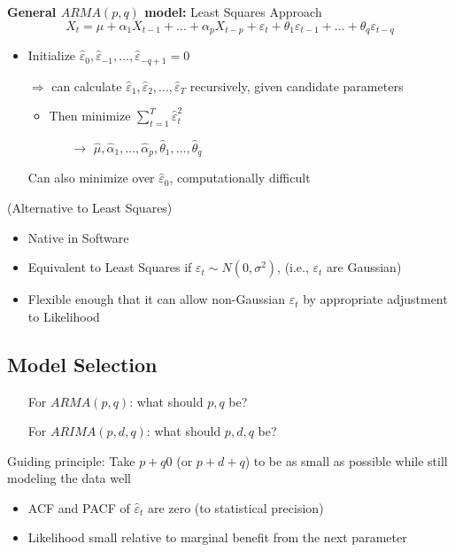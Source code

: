 \textbf{General $ARMA(p,q)$ model:} Least Squares Approach
\[
X_t=\mu+\alpha_1X_{t-1}+...+\alpha_p X_{t-p}+\varepsilon_t+\theta_1 \varepsilon_{t-1}+...+\theta_q\varepsilon_{t-q}
\]
\begin{itemize}
    \item Initialize $\hat{\varepsilon}_0, \hat{\varepsilon}_{-1},...,\hat{\varepsilon}_{-q+1}=0 $
    \item[$\Rightarrow$] can calculate $\hat{\varepsilon}_1,\hat{\varepsilon}_2,...,\hat{\varepsilon}_T $ recursively, given candidate parameters
    \begin{itemize}
        \item Then minimize $\sum_{t=1}^T\hat{\varepsilon}_t^2 $
        \begin{itemize}
            \item[$\rightarrow$] $\hat{\mu},\hat{\alpha}_1,...,\hat{\alpha}_p, \hat{\theta}_1,...,\hat{\theta}_q $
        \end{itemize}
    \end{itemize}
    \item[] Can also minimize over $\hat{\varepsilon}_0$, computationally difficult 
\end{itemize}
 \quad (Alternative to Least Squares)
\begin{itemize}
    \item Native in Software
    \item Equivalent to Least Squares if $\varepsilon_t \sim N(0,\sigma^2)$, (i.e., $\varepsilon_t$ are Gaussian)
    \item Flexible enough that it can allow non-Gaussian $\varepsilon_t$ by appropriate adjustment to Likelihood
\end{itemize}

\subsection{Model Selection}

\begin{itemize}
    \item[] For $ARMA(p,q)$: \quad what should $p,q$ be?
    \item[] For $ARIMA(p,d,q)$: \quad what should $p,d,q$ be?
\end{itemize}
Guiding principle: Take $p+q0$ (or $p+d+q$) to be as small as possible while still modeling the data well
\begin{itemize}
    \item ACF and PACF of $\hat{\varepsilon}_t$ are zero (to statistical precision)
    \item Likelihood small relative to marginal benefit from the next parameter
\end{itemize}

